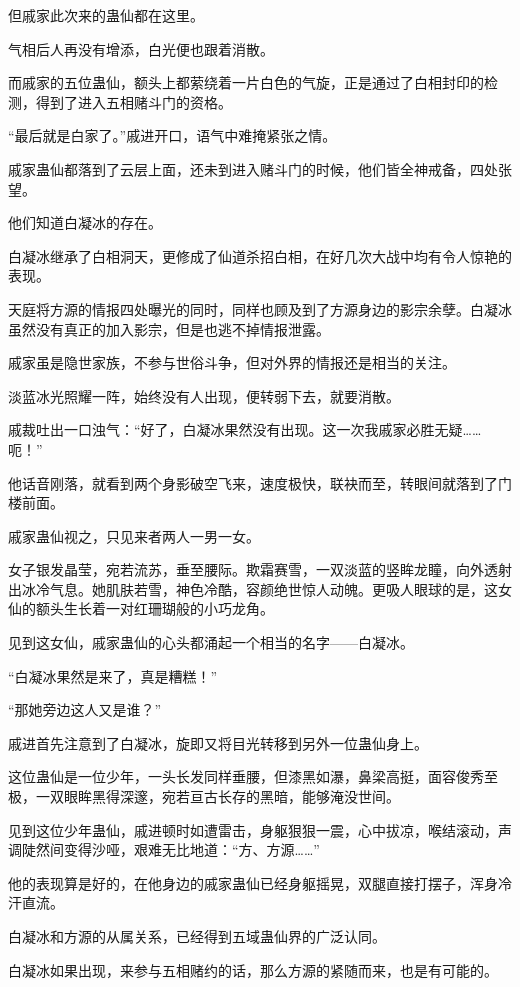 \begin{this_body}
但戚家此次来的蛊仙都在这里。

气相后人再没有增添，白光便也跟着消散。

而戚家的五位蛊仙，额头上都萦绕着一片白色的气旋，正是通过了白相封印的检测，得到了进入五相赌斗门的资格。

“最后就是白家了。”戚进开口，语气中难掩紧张之情。

戚家蛊仙都落到了云层上面，还未到进入赌斗门的时候，他们皆全神戒备，四处张望。

他们知道白凝冰的存在。

白凝冰继承了白相洞天，更修成了仙道杀招白相，在好几次大战中均有令人惊艳的表现。

天庭将方源的情报四处曝光的同时，同样也顾及到了方源身边的影宗余孽。白凝冰虽然没有真正的加入影宗，但是也逃不掉情报泄露。

戚家虽是隐世家族，不参与世俗斗争，但对外界的情报还是相当的关注。

淡蓝冰光照耀一阵，始终没有人出现，便转弱下去，就要消散。

戚裁吐出一口浊气：“好了，白凝冰果然没有出现。这一次我戚家必胜无疑……呃！”

他话音刚落，就看到两个身影破空飞来，速度极快，联袂而至，转眼间就落到了门楼前面。

戚家蛊仙视之，只见来者两人一男一女。

女子银发晶莹，宛若流苏，垂至腰际。欺霜赛雪，一双淡蓝的竖眸龙瞳，向外透射出冰冷气息。她肌肤若雪，神色冷酷，容颜绝世惊人动魄。更吸人眼球的是，这女仙的额头生长着一对红珊瑚般的小巧龙角。

见到这女仙，戚家蛊仙的心头都涌起一个相当的名字——白凝冰。

“白凝冰果然是来了，真是糟糕！”

“那她旁边这人又是谁？”

戚进首先注意到了白凝冰，旋即又将目光转移到另外一位蛊仙身上。

这位蛊仙是一位少年，一头长发同样垂腰，但漆黑如瀑，鼻梁高挺，面容俊秀至极，一双眼眸黑得深邃，宛若亘古长存的黑暗，能够淹没世间。

见到这位少年蛊仙，戚进顿时如遭雷击，身躯狠狠一震，心中拔凉，喉结滚动，声调陡然间变得沙哑，艰难无比地道：“方、方源……”

他的表现算是好的，在他身边的戚家蛊仙已经身躯摇晃，双腿直接打摆子，浑身冷汗直流。

白凝冰和方源的从属关系，已经得到五域蛊仙界的广泛认同。

白凝冰如果出现，来参与五相赌约的话，那么方源的紧随而来，也是有可能的。


\end{this_body}

